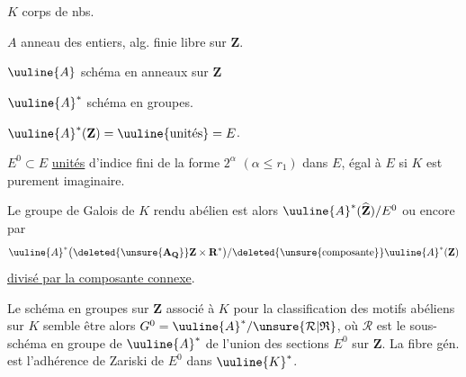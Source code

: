 $K$ corps de nbs.

$A$ anneau des entiers, alg. finie libre sur $\mathbf Z$.

$\uuline{A}$ schéma en anneaux sur $\mathbf Z$

$\uuline{A}^*$ schéma en groupes.

$\uuline{A}^*(\mathbf Z)=\uuline{\text{unités}}=E$.

$E^0\subset E$ \uline{unités} \uline{} d'indice fini de la forme $2^\alpha$ $(\alpha\leq r_1)$ dans $E$, égal à $E$ si $K$ est purement imaginaire.

 Le groupe de Galois de $K$ rendu abélien est alors  $\uuline{A}^*(\widehat{\mathbf Z})/E^0$ ou encore par
\[
\uuline{A}^*\bigl(\deleted{\unsure{\mathbf A_{\mathbf Q}}}\mathbf Z\times\mathbf R^*\bigr)/\deleted{\text{\unsure{composante}}}\uuline{A}^*(\mathbf Z)
\]
\uline{divisé par la composante connexe}.

Le schéma en groupes  sur $\mathbf Z$ associé à $K$ pour la classification des motifs abéliens sur $K$ semble être alors $G^0=\uuline{A}^*/\unsure{\mathcal R|\mathfrak R}$, où $\mathcal R$ est le sous-schéma en groupe de $\uuline{A}^*$  de l'union des sections $E^0$ sur $\mathbf Z$. La fibre gén. est l'adhérence  de Zariski de $E^0$ dans $\uuline{K}^*$.
